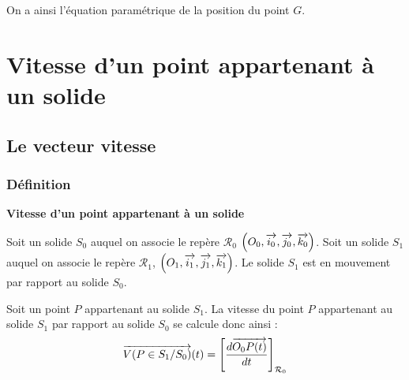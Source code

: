 \documentclass[10pt,oneside]{article}
\begin{document}
\begin{exemple}
On a ainsi l'équation paramétrique de la position du point $G$.

\vspace{.25cm}

\end{exemple}
\section{Vitesse d'un point appartenant à un solide}

\subsection{Le vecteur vitesse}
\subsubsection{Définition}

\begin{defi}
\textbf{Vitesse d'un point appartenant à un solide}

Soit un solide $S_0$ auquel on associe le repère $\mathcal{R}_0$ $\left(O_0,\overrightarrow{i_0},\overrightarrow{j_0},\overrightarrow{k_0} \right)$.  Soit un solide $S_1$ auquel on associe le repère $\mathcal{R}_1$,  $\left(O_1,\overrightarrow{i_1},\overrightarrow{j_1},\overrightarrow{k_1} \right)$. Le solide $S_1$ est en mouvement par rapport au solide $S_0$. 

Soit un point $P$ appartenant au solide $S_1$. La vitesse du point $P$ appartenant au solide $S_1$ par rapport au solide $S_0$ se calcule donc ainsi : 
$$
\overrightarrow{V(P\in S_1/S_0)}(t) = \left[\dfrac{d\overrightarrow{O_0P(t)}}{dt}\right]_{\mathcal{R}_0}
$$
\end{defi}
\end{document}
